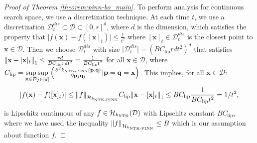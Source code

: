\begin{proof}[Proof of Theorem \ref{theorem:pinn-bo_main}]
    

To perform analysis for continuous search space, we use a discretization technique. At each time $t$, we use a discretization $\mathcal{D}_t^{dis} \subset \mathcal{D} \subset [0, r]^d$, where $d$ is the dimension, which satisfies the property that $\lvert f(\mathbf{x}) - f([\mathbf{x}]_t) \rvert \leq \frac{1}{t^2}$ where $[\mathbf{x}]_t \in \mathcal{D}_t^{dis}$ is the closest point to $\mathbf{x} \in \mathcal{D}$. Then we choose $\mathcal{D}_t^{dis}$ 
with size $\lvert \mathcal{D}_t^{dis} \rvert = \left( BC_{\text{lip}}rdt^2 \right)^d$ that satisfies $\norm{\mathbf{x} - [\mathbf{x}]_t}_1 \leq \frac{rd}{BC_{\text{lip}}rdt^2} = \frac{1}{BC_{\text{lip}}t^2}$ for all $\mathbf{x} \in \mathcal{D}$,
where $C_{\text{lip}}= \underset{\mathbf{x} \in \mathcal{D}} {\operatorname*{sup}} \underset{j \in [d]} {\operatorname*{sup}} \left( \frac{\partial^2 k_\text{NTK-PINN}(\mathbf{p},\mathbf{q})}{\partial \mathbf{p}_j \mathbf{q}_j} \lvert \mathbf{p}=\mathbf{q}=\mathbf{x} \right)$. This implies, for all $\mathbf{x} \in \mathcal{D}$:
\begin{align*}
    \lvert f(\mathbf{x}) - f([\mathbf{x}]_t) \rvert \leq \norm{f}_{\mathcal{H}_{k_\textup{NTK-PINN}}} C_{\text{lip}} \norm{\mathbf{x} - [\mathbf{x}]_t}_1 \leq BC_{\text{lip}} \frac{1}{BC_{\text{lip}}t^2} =  1/t^2, 
\end{align*}
is Lipschitz continuous of any $f \in \mathcal{H}_{k_\textup{NTK}}(\mathcal{D})$ with Lipschitz constant $B C_{\text{lip}}$, where we have used the inequality $\norm{f}_{\mathcal{H}_{k_\textup{NTK-PINN}}} \leq B $  which is our assumption about function $f$.


\end{proof}
